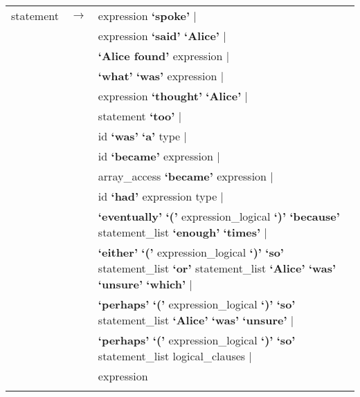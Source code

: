 \documentclass[landscape]{article}
\begin{document}
\begin{longtable}{ l c l}
    statement & \ensuremath{\to} &  expression  \textbf{`spoke'}  | \\
    & &  expression  \textbf{`said'} \textbf{`Alice'}  | \\
    & & \textbf{`Alice found'} expression   | \\
    & &  \textbf{`what'} \textbf{`was'} expression   | \\
    & &  expression  \textbf{`thought'} \textbf{`Alice'}  | \\
    & &  statement  \textbf{`too'}  | \\
    & &  id \textbf{`was'} \textbf{`a'} type   | \\
    & &  id \textbf{`became'} expression   | \\
    & &  array\_access  \textbf{`became'} expression   | \\
    & &  id \textbf{`had'} expression  type |\\
    & &  \textbf{`eventually'} \textbf{`('} expression\_logical  \textbf{`)'} \textbf{`because'} statement\_list  \textbf{`enough'} \textbf{`times'}  |\\
    & &  \textbf{`either'} \textbf{`('} expression\_logical  \textbf{`)'} \textbf{`so'} statement\_list  \textbf{`or'} statement\_list  \textbf{`Alice'} \textbf{`was'} \textbf{`unsure'} \textbf{`which'}  | \\
    & &  \textbf{`perhaps'} \textbf{`('} expression\_logical  \textbf{`)'} \textbf{`so'} statement\_list  \textbf{`Alice'} \textbf{`was'} \textbf{`unsure'}  | \\
    & &  \textbf{`perhaps'} \textbf{`('} expression\_logical  \textbf{`)'} \textbf{`so'} statement\_list  logical\_clauses |   \\
    & & expression \\

    \\


\end{longtable}
\end{document}
